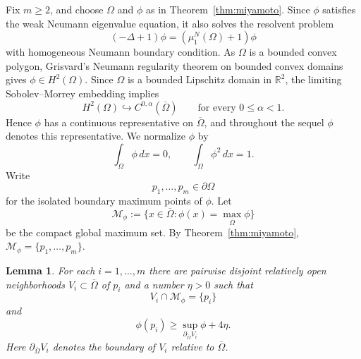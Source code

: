 \documentclass[11pt]{amsart}
\newtheorem{lemma}[theorem]{Lemma}
\newtheorem{remark}[theorem]{Remark}
\numberwithin{equation}{section}
\newcommand{\Om}{\Omega}
\begin{document}

Fix $m\ge2$, and choose $\Om$ and $\phi$ as in
Theorem~\ref{thm:miyamoto}.  Since $\phi$ satisfies the weak Neumann eigenvalue
equation, it also solves the resolvent problem
$$
(-\Delta+1)\phi=(\mu_1^N(\Om)+1)\phi
$$
with homogeneous Neumann boundary condition.  As $\Om$ is a bounded convex
polygon, Grisvard's Neumann regularity theorem on bounded convex domains
\cite[Theorem~3.2.1.3]{Grisvard} gives $\phi\in H^2(\Om)$.  Since $\Om$ is a
bounded Lipschitz domain in $\mathbb R^2$, the limiting Sobolev--Morrey embedding
\cite[Section 1.4]{Grisvard} implies
$$
H^2(\Om)\hookrightarrow C^{0,\alpha}(\overline\Om)
\qquad\text{for every }0\le\alpha<1.
$$
Hence $\phi$ has a continuous representative on $\overline\Om$, and throughout
the sequel $\phi$ denotes this representative. We normalize $\phi$ by
\begin{equation}\label{eq:phi-normalization}
\int_\Om \phi\,dx=0,
\qquad
\int_\Om \phi^2\,dx=1.
\end{equation}
Write
$$
p_1,\ldots,p_m\in\partial\Om
$$
for the isolated boundary maximum points of $\phi$.  Let
\begin{equation}\label{eq:max-set}
\mathcal M_\phi:=\{x\in\overline\Om:\phi(x)=\max_{\overline\Om}\phi\}
\end{equation}
be the compact global maximum set.  By Theorem~\ref{thm:miyamoto},
$\mathcal M_\phi=\{p_1,\ldots,p_m\}$.

\begin{lemma}\label{lem:strict-neighborhoods-domain}
For each $i=1,\ldots,m$ there are pairwise disjoint relatively open
neighborhoods $V_i\subset \overline\Om$ of $p_i$ and a number $\eta>0$ such that
\begin{equation}\label{eq:Vi-meets-max-set}
V_i\cap \mathcal M_\phi=\{p_i\}
\end{equation}
and
\begin{equation}\label{eq:boundary-gap-domain}
\phi(p_i)\ge \sup_{\partial_{\overline\Om} V_i}\phi+4\eta.
\end{equation}
Here $\partial_{\overline\Om}V_i$ denotes the boundary of $V_i$ relative to
$\overline\Om$.
\end{lemma}
\end{document}
